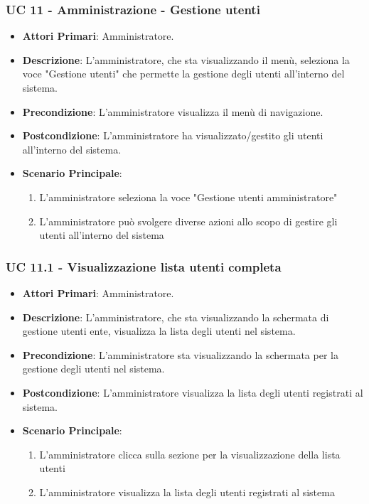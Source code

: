 \subsubsection{UC 11 - Amministrazione - Gestione utenti}

		\begin{itemize}
			\item \textbf{Attori Primari}: Amministratore.
			\item \textbf{Descrizione}: L'amministratore, che sta visualizzando il menù, seleziona la voce "Gestione utenti" che permette la gestione degli utenti all'interno del sistema.
			\item \textbf{Precondizione}: L'amministratore visualizza il menù di navigazione.
			\item \textbf{Postcondizione}: L'amministratore ha visualizzato/gestito gli utenti all'interno del sistema. 
			\item \textbf{Scenario Principale}:
			\begin{enumerate}
				\item{L'amministratore seleziona la voce "Gestione utenti amministratore"}
				\item{L'amministratore può svolgere diverse azioni allo scopo di gestire gli utenti all'interno del sistema}
			\end{enumerate}	
		\end{itemize}

			\subsubsection{UC 11.1 - Visualizzazione lista utenti completa}
			\begin{itemize}
				\item \textbf{Attori Primari}: Amministratore.
				\item \textbf{Descrizione}: L'amministratore, che sta visualizzando la schermata di gestione utenti ente, visualizza la lista degli utenti nel sistema.
				\item \textbf{Precondizione}: L'amministratore sta visualizzando la schermata per la gestione degli utenti nel sistema.
				\item \textbf{Postcondizione}: L'amministratore visualizza la lista degli utenti registrati al sistema.
				\item \textbf{Scenario Principale}:
				\begin{enumerate}
					\item{L'amministratore clicca sulla sezione per la visualizzazione della lista utenti}
					\item{L'amministratore visualizza la lista degli utenti registrati al sistema}
				\end{enumerate}	
			\end{itemize}
			
